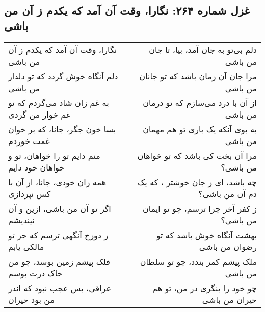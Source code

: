 \begin{center}
\section*{غزل شماره ۲۶۴: نگارا، وقت آن آمد که یکدم ز آن من باشی}
\label{sec:264}
\begin{longtable}{l p{0.5cm} r}
نگارا، وقت آن آمد که یکدم ز آن من باشی
&&
دلم بی‌تو به جان آمد، بیا، تا جان من باشی
\\
دلم آنگاه خوش گردد که تو دلدار من باشی
&&
مرا جان آن زمان باشد که تو جانان من باشی
\\
به غم زان شاد می‌گردم که تو غم خوار من گردی
&&
از آن با درد می‌سازم که تو درمان من باشی
\\
بسا خون جگر، جانا، که بر خوان غمت خوردم
&&
به بوی آنکه یک باری تو هم مهمان من باشی
\\
منم دایم تو را خواهان، تو و خواهان خود دایم
&&
مرا آن بخت کی باشد که تو خواهان من باشی؟
\\
همه زان خودی، جانا، از آن با کس نپردازی
&&
چه باشد، ای ز جان خوشتر ، که یک دم آن من باشی؟
\\
اگر تو آن من باشی، ازین و آن نیندیشم
&&
ز کفر آخر چرا ترسم، چو تو ایمان من باشی؟
\\
ز دوزخ آنگهی ترسم که جز تو مالکی یابم
&&
بهشت آنگاه خوش باشد که تو رضوان من باشی
\\
فلک پیشم زمین بوسد، چو من خاک درت بوسم
&&
ملک پیشم کمر بندد، چو تو سلطان من باشی
\\
عراقی، بس عجب نبود که اندر من بود حیران
&&
چو خود را بنگری در من، تو هم حیران من باشی
\\
\end{longtable}
\end{center}
